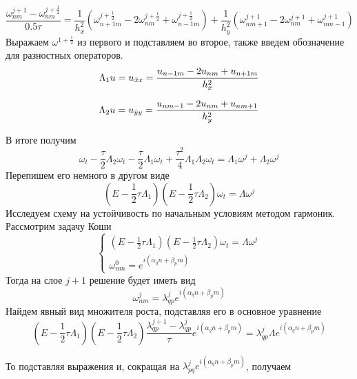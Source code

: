 \documentclass{article}
\begin{document}
$$
\frac{\omega_{nm}^{j+1} - \omega_{nm}^{j+\frac{1}{2}}}{0.5\tau} = \frac{1}{h_x^2}\left(\omega_{n+1 m }^{j+\frac{1}{2}} - 2\omega_{n m }^{j+\frac{1}{2}} + \omega_{n-1 m }^{j+\frac{1}{2}}   \right) + \frac{1}{h_y^2}\left(\omega_{n m+1 }^{j+1} - 2\omega_{n m }^{j+1} + \omega_{n m-1 }^{j+1}   \right)
$$
Выражаем $\omega^{1+\frac{1}{2}}$ из первого и подставляем во второе, также введем обозначение для разностных операторов.
$$
\Lambda_1 u = u_{\Bar{x}x} = \frac{u_{n-1m} - 2u_{nm} + u_{n+1m}}{h_x^2}
$$

$$
\Lambda_2 u = u_{\Bar{y}y} = \frac{u_{nm-1} - 2u_{nm} + u_{nm+1}}{h_y^2}
$$

В итоге получим
$$
\omega_t - \frac{\tau}{2}\Lambda_2\omega_t - \frac{\tau}{2}\Lambda_1\omega_t +\frac{\tau^2}{4}\Lambda_1\Lambda_2\omega_t = \Lambda_1 \omega^j + \Lambda_2 \omega^j
$$
Перепишем его немного в другом виде
$$
(E - \frac{1}{2}\tau\Lambda_1)(E - \frac{1}{2}\tau\Lambda_2)\omega_t = \Lambda \omega^j
$$
Исследуем схему на устойчивость по начальным условиям методом гармоник. Рассмотрим задачу Коши 
\begin{equation}
    \begin{cases}
    (E - \frac{1}{2}\tau\Lambda_1)(E - \frac{1}{2}\tau\Lambda_2)\omega_t = \Lambda \omega^j\\
    \omega^0_{nm} = e^{i(\alpha_qn + \beta_p m)}
    \end{cases}
\end{equation}
Тогда на слое $j+1$ решение будет иметь вид 
$$
\omega^j_{nm} = \lambda_{qp}^{j} e^{i(\alpha_qn + \beta_p m)}
$$
Найдем явный вид множителя роста, подставляя его в основное уравнение
$$
(E - \frac{1}{2}\tau\Lambda_1)(E - \frac{1}{2}\tau\Lambda_2)\frac{\lambda_{qp}^{j+1} - \lambda_{qp}^{j}}{\tau}e^{i(\alpha_qn + \beta_p m)} = \lambda_{qp}^{j}\Lambda e^{i(\alpha_qn + \beta_p m)}
$$
\begin{figure}[h]
\end{figure}

\newpage
\begin{figure}[h]
\end{figure}
То подставляя выражения и, сокращая на $\lambda_{pq}^je^{i(\alpha_qn + \beta_p m)}$, получаем
\begin{figure}[h]
\end{figure}

\begin{figure}[h]
\end{figure}
\end{document}
